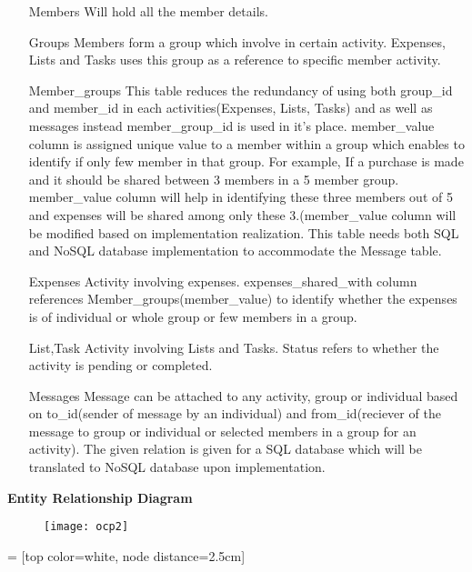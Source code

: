 \documentclass[11]{article}
\numberwithin{equation}{section}
\begin{document}
\begin{enumerate}
\item[Members] Will hold all the member details.
\item[Groups] Members form a group which involve in certain activity. Expenses, Lists and Tasks uses this group as a reference to specific member activity.
\item[Member\_groups] This table reduces the redundancy of using both group\_id and member\_id in each activities(Expenses, Lists, Tasks) and as well as messages instead member\_group\_id is used in it's place. member\_value column is assigned unique value to a member within a group which enables to identify if only few member in that group. For example, If a purchase is made and it should be shared between 3 members in a 5 member group. member\_value column will help in identifying these three members out of 5 and expenses will be shared among only these 3.(member\_value column will be modified based on implementation realization. This table needs both SQL and NoSQL database implementation to accommodate the Message table.
\item[Expenses] Activity involving expenses. expenses\_shared\_with column references Member\_groups(member\_value) to identify whether the expenses is of individual or whole group or few members in a group.
\item[List,Task] Activity involving Lists and Tasks. Status refers to whether the activity is pending or completed.
\item[Messages] Message can be attached to any activity, group or individual based on to\_id(sender of message by an individual) and from\_id(reciever of the message to group or individual or selected members in a group for an activity). The given relation is given for a SQL database which will be translated to NoSQL database upon implementation.
\end{enumerate}
\noindent \textbf{Entity Relationship Diagram} \\
\begin{figure}[h]
     \centering
          \label{ocpic}
                \texttt{[image: ocp2]}
\end{figure}
\iffalse {} = [top color=white, node distance=2.5cm]
\end{document}
